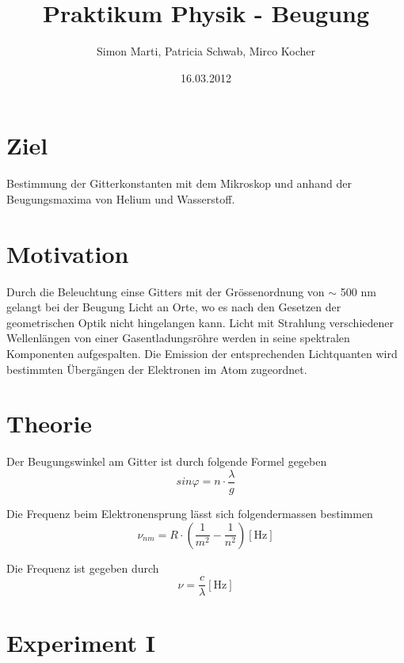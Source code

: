 \documentclass[12pt,a4paper]{article}
\title{Praktikum Physik - Beugung}
\author{Simon Marti, Patricia Schwab, Mirco Kocher}
\date{16.03.2012}
\begin{document}
\maketitle

\section*{Ziel}
Bestimmung der Gitterkonstanten mit dem Mikroskop und anhand der Beugungsmaxima von Helium und Wasserstoff.

\section*{Motivation}
Durch die Beleuchtung einse Gitters mit der Gr\"ossenordnung von $\sim$ 500 nm gelangt bei der Beugung Licht an Orte, wo es nach den Gesetzen der geometrischen Optik nicht hingelangen kann. Licht mit Strahlung verschiedener Wellenl\"angen von einer Gasentladungsr\"ohre werden in seine spektralen Komponenten aufgespalten. Die Emission der entsprechenden Lichtquanten wird bestimmten \"Uberg\"angen der Elektronen im Atom zugeordnet.


\section*{Theorie}
Der Beugungswinkel am Gitter ist durch folgende Formel gegeben
\begin{equation}\label{eq:g}
sin\varphi = n\cdot \frac{\lambda}{g}
\end{equation}

Die Frequenz beim Elektronensprung l\"asst sich folgendermassen bestimmen
\begin{equation}\label{eq:e}
\nu_{nm} = R\cdot \left(\frac{1}{m^2}-\frac{1}{n^2}\right) [\mbox{Hz}]
\end{equation}

Die Frequenz ist gegeben durch 
\begin{equation}\label{eq:f}
\nu = \frac{c}{\lambda} [\mbox{Hz}]
\end{equation}

\section*{Experiment I}

\end{document}
